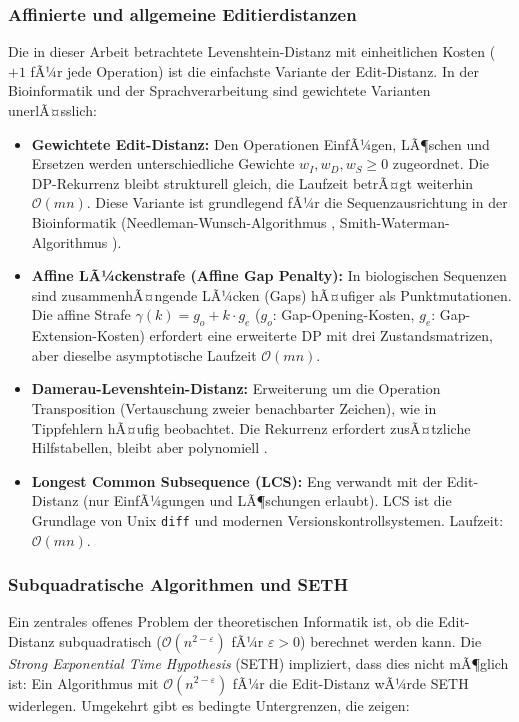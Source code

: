﻿\documentclass[a4paper,12pt]{article}
\theoremstyle{definition}
\begin{document}
\subsubsection{Affinierte und allgemeine Editierdistanzen}

Die in dieser Arbeit betrachtete Levenshtein-Distanz mit einheitlichen Kosten ($+1$
fÃ¼r jede Operation) ist die einfachste Variante der Edit-Distanz. In der Bioinformatik
und der Sprachverarbeitung sind gewichtete Varianten unerlÃ¤sslich:

\begin{itemize}
    \item \textbf{Gewichtete Edit-Distanz:} Den Operationen EinfÃ¼gen, LÃ¶schen und
          Ersetzen werden unterschiedliche Gewichte $w_I, w_D, w_S \geq 0$ zugeordnet.
          Die DP-Rekurrenz bleibt strukturell gleich, die Laufzeit betrÃ¤gt weiterhin
          $\mathcal{O}(mn)$. Diese Variante ist grundlegend fÃ¼r die Sequenzausrichtung
          in der Bioinformatik (Needleman-Wunsch-Algorithmus \cite{needleman1970},
          Smith-Waterman-Algorithmus \cite{smith1981}).
    \item \textbf{Affine LÃ¼ckenstrafe (Affine Gap Penalty):} In biologischen
          Sequenzen sind zusammenhÃ¤ngende LÃ¼cken (Gaps) hÃ¤ufiger als Punktmutationen.
          Die affine Strafe $\gamma(k) = g_o + k \cdot g_e$ ($g_o$: Gap-Opening-Kosten,
          $g_e$: Gap-Extension-Kosten) erfordert eine erweiterte DP mit drei
          Zustandsmatrizen, aber dieselbe asymptotische Laufzeit $\mathcal{O}(mn)$.
    \item \textbf{Damerau-Levenshtein-Distanz:} Erweiterung um die Operation
          Transposition (Vertauschung zweier benachbarter Zeichen), wie in
          Tippfehlern hÃ¤ufig beobachtet. Die Rekurrenz erfordert zusÃ¤tzliche
          Hilfstabellen, bleibt aber polynomiell \cite{damerau1964}.
    \item \textbf{Longest Common Subsequence (LCS):} Eng verwandt mit der
          Edit-Distanz (nur EinfÃ¼gungen und LÃ¶schungen erlaubt). LCS ist die
          Grundlage von Unix \texttt{diff} und modernen Versionskontrollsystemen.
          Laufzeit: $\mathcal{O}(mn)$.
\end{itemize}

\subsubsection{Subquadratische Algorithmen und SETH}

Ein zentrales offenes Problem der theoretischen Informatik ist, ob die
Edit-Distanz subquadratisch ($\mathcal{O}(n^{2-\varepsilon})$ fÃ¼r $\varepsilon > 0$)
berechnet werden kann. Die \emph{Strong Exponential Time Hypothesis} (SETH)
\cite{williams2005} impliziert, dass dies nicht mÃ¶glich ist: Ein Algorithmus mit
$\mathcal{O}(n^{2-\varepsilon})$ fÃ¼r die Edit-Distanz wÃ¼rde SETH widerlegen.
Umgekehrt gibt es bedingte Untergrenzen, die zeigen:
\end{document}
